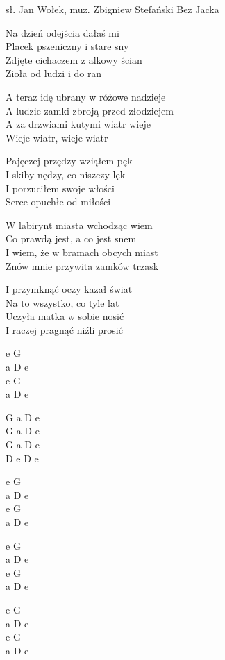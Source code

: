 {sł. Jan Wołek, muz. Zbigniew Stefański}
{Bez Jacka}
\begin{text}
Na dzień odejścia dałaś mi\\
Placek pszeniczny i stare sny\\
Zdjęte cichaczem z alkowy ścian\\
Zioła od ludzi i do ran

A teraz idę ubrany w różowe nadzieje\\
A ludzie zamki zbroją przed złodziejem\\
A za drzwiami kutymi wiatr wieje\\
Wieje wiatr, wieje wiatr

Pajęczej przędzy wziąłem pęk\\
I skiby nędzy, co niszczy lęk\\
I porzuciłem swoje włości\\
Serce opuchłe od miłości

W labirynt miasta wchodząc wiem\\
Co prawdą jest, a co jest snem\\
I wiem, że w bramach obcych miast\\
Znów mnie przywita zamków trzask

I przymknąć oczy kazał świat\\
Na to wszystko, co tyle lat\\
Uczyła matka w sobie nosić\\
I raczej pragnąć niźli prosić
\end{text}
\begin{chord}
    e G\\
    a D e\\
    e G\\
    a D e

    G a D e\\
    G a D e\\
    G a D e\\
    D e D e

    e G\\
    a D e\\
    e G\\
    a D e

    e G\\
    a D e\\
    e G\\
    a D e

    e G\\
    a D e\\
    e G\\
    a D e
\end{chord}
